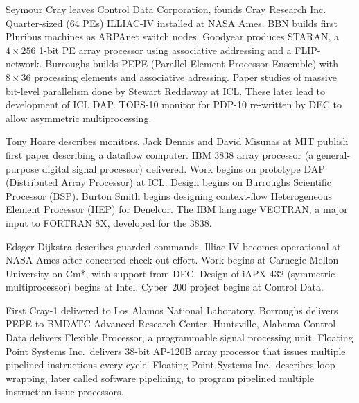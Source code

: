 	{Seymour Cray leaves Control Data Corporation,
	founds Cray Research Inc.}
	{Quarter-sized (64 PEs) ILLIAC-IV installed at NASA Ames.}
	{BBN builds first Pluribus machines as ARPAnet switch nodes.}
        {Goodyear produces STARAN, a $4{\times}256$ 1-bit PE array processor
        using associative addressing and a FLIP-network.}
        {Burroughs builds PEPE (Parallel Element Processor Ensemble) with 
        $8{\times}36$ processing elements and associative adressing.}
	{Paper studies of massive bit-level parallelism done
	by Stewart Reddaway at ICL.
	These later lead to development of ICL DAP.}
	{TOPS-10 monitor for PDP-10 re-written by DEC
	to allow asymmetric multiprocessing.}

	{Tony Hoare describes monitors.}
	{Jack Dennis and David Misunas at MIT publish first paper describing
	a dataflow computer.}
	{IBM 3838 array processor
	(a general-purpose digital signal processor) delivered.}
	{Work begins on prototype DAP (Distributed Array Processor) at ICL.}
	{Design begins on Burroughs Scientific Processor (BSP).}
	{Burton Smith begins designing context-flow
	Heterogeneous Element Processor (HEP) for Denelcor.}
	{The IBM language VECTRAN,
	a major input to FORTRAN 8X,
	developed for the 3838.}

	{Edsger Dijkstra describes guarded commands.}
	{Illiac-IV becomes operational at NASA Ames after concerted 
	check out effort.}
	{Work begins at Carnegie-Mellon University on Cm*,
	with support from DEC.}
	{Design of iAPX 432 (symmetric multiprocessor) begins at Intel.}
	{Cyber~200 project begins at Control Data.}

	{First Cray-1 delivered to Los Alamos National Laboratory.}
        {Borroughs delivers PEPE to BMDATC Advanced Research Center, 
        Huntsville, Alabama}
	{Control Data delivers Flexible Processor, 
	a programmable signal processing unit.}
	{Floating Point Systems Inc.\ delivers 38-bit AP-120B 
	array processor that issues multiple pipelined instructions 
	every cycle.}
	{Floating Point Systems Inc.\ describes loop wrapping,
	later called software pipelining,
	to program pipelined multiple instruction issue processors.}


